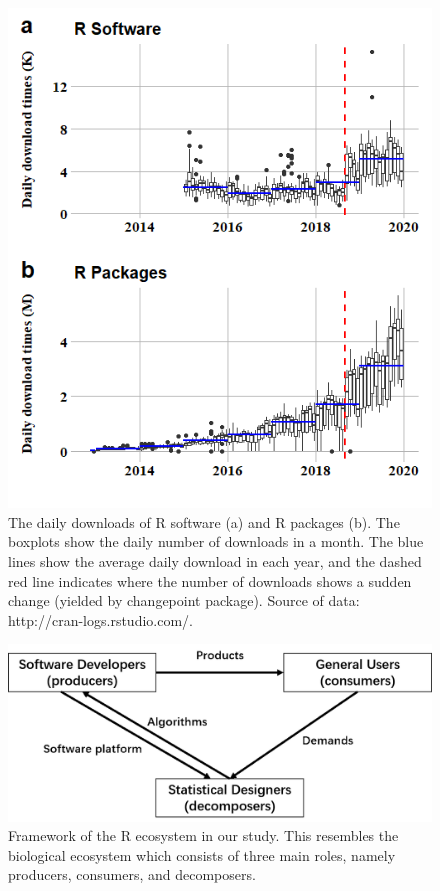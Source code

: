 \begin{Schunk}
\begin{figure}
\includegraphics[width=1\linewidth,height=0.3\textheight]{fig1} \caption[The daily downloads of R software (a) and R packages (b)]{The daily downloads of R software (a) and R packages (b). The boxplots show the daily number of downloads in a month. The blue lines show the average daily download in each year, and the dashed red line indicates where the number of downloads shows a sudden change (yielded by changepoint package). Source of data: http://cran-logs.rstudio.com/. }\label{fig:fig1}
\end{figure}
\end{Schunk}

\begin{Schunk}
\begin{figure}
\includegraphics[width=1\linewidth,height=0.3\textheight]{fig2} \caption[Framework of the R ecosystem in our study]{Framework of the R ecosystem in our study. This resembles the biological ecosystem which consists of three main roles, namely producers, consumers, and decomposers. }\label{fig:fig2}
\end{figure}
\end{Schunk}

